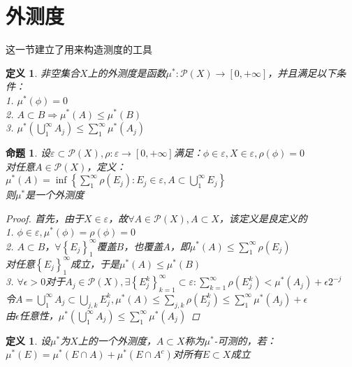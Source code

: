 \documentclass[12pt, a4paper, oneside]{ctexbook}
\newtheorem{definition}[theorem]{定义}
\newtheorem{proposition}[theorem]{命题}
\begin{document}
\section{外测度}
这一节建立了用来构造测度的工具
\begin{definition}
    非空集合$X$上的外测度是函数$\mu^*:\mathcal{P}(X)\rightarrow [0,+\infty]$，并且满足以下条件：\\
    1. $\mu^*(\phi)=0$\\
    2. $A\subset B\Rightarrow \mu^*(A)\leq \mu^*(B)$\\
    3. $\mu^*(\bigcup_1^{\infty}A_j)\leq \sum_1^{\infty}\mu^*(A_j)$
\end{definition}
\begin{proposition}
    设$\varepsilon\subset\mathcal{P}(X),\rho:\varepsilon\rightarrow [0,+\infty]$满足：$\phi\in\varepsilon,X\in\varepsilon,\rho(\phi)=0$\\
    对任意$A\in\mathcal{P}(X)$，定义：\\
    $\mu^*(A)=\inf\left\{\sum_1^{\infty}\rho(E_j):E_j\in\varepsilon,A\subset\bigcup_1^{\infty}E_j\right\}$\\
    则$\mu^*$是一个外测度
    \begin{proof}
        首先，由于$X\in\varepsilon$，故$\forall A\in\mathcal{P}(X),A\subset X$，该定义是良定义的\\
        1. $\phi\in\varepsilon,\mu^*(\phi)=\rho(\phi)=0$\\
        2. $A\subset B$，$\forall\left\{E_j\right\}_1^{\infty}$覆盖$B$，也覆盖$A$，即$\mu^*(A)\leq\sum_1^{\infty}\rho(E_j)$\\
        对任意$\left\{E_j\right\}_1^{\infty}$成立，于是$\mu^*(A)\leq\mu^*(B)$\\
        3. $\forall \epsilon>0$对于$A_j\in\mathcal{P}(X),\exists\left\{E_j^k\right\}_{k=1}^{\infty}\subset\varepsilon:\sum_{k=1}^{\infty}\rho(E_j^k)<\mu^*(A_j)+\epsilon2^{-j}$\\
        令$A=\bigcup_1^{\infty}A_j\subset\bigcup_{j,k}E_j^k,\mu^*(A)\leq\sum_{j,k}\rho(E_j^k)\leq\sum_1^{\infty}\mu^*(A_j)+\epsilon$\\
        由$\epsilon$任意性，$\mu^*(\bigcup_1^{\infty}A_j)\leq\sum_1^{\infty}\mu^*(A_j)$
    \end{proof}
\end{proposition}
\begin{definition}
    设$\mu^*$为$X$上的一个外测度，$A\subset X$称为$\mu^*$-可测的，若：\\
    $\mu^*(E)=\mu^*(E\cap A)+\mu^*(E\cap A^c)$对所有$E\subset X$成立
\end{definition}
\end{document}
